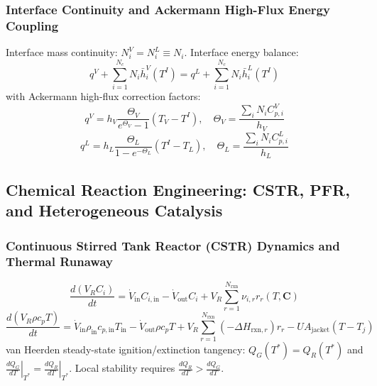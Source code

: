 \documentclass[11pt,a4paper]{article}
\begin{document}
\subsubsection{Interface Continuity and Ackermann High-Flux Energy Coupling}
Interface mass continuity: $N_i^V = N_i^L \equiv N_i$. Interface energy balance:
\begin{equation}
q^V + \sum_{i=1}^{N_c} N_i \bar{h}_i^V(T^I) = q^L + \sum_{i=1}^{N_c} N_i \bar{h}_i^L(T^I)
\end{equation}
with Ackermann high-flux correction factors:
\begin{equation}
q^V = h_V \frac{\Theta_V}{e^{\Theta_V} - 1} (T_V - T^I), \quad \Theta_V = \frac{\sum_i N_i C_{p,i}^V}{h_V}
\end{equation}
\begin{equation}
q^L = h_L \frac{\Theta_L}{1 - e^{-\Theta_L}} (T^I - T_L), \quad \Theta_L = \frac{\sum_i N_i C_{p,i}^L}{h_L}
\end{equation}

\subsection{Chemical Reaction Engineering: CSTR, PFR, and Heterogeneous Catalysis}

\subsubsection{Continuous Stirred Tank Reactor (CSTR) Dynamics and Thermal Runaway}
\begin{equation}
\frac{d(V_R C_i)}{dt} = \dot{V}_{\text{in}} C_{i,\text{in}} - \dot{V}_{\text{out}} C_i + V_R \sum_{r=1}^{N_{\text{rxn}}} \nu_{i,r} r_r(T, \mathbf{C})
\end{equation}
\begin{equation}
\frac{d(V_R \rho c_p T)}{dt} = \dot{V}_{\text{in}} \rho_{\text{in}} c_{p,\text{in}} T_{\text{in}} - \dot{V}_{\text{out}} \rho c_p T + V_R \sum_{r=1}^{N_{\text{rxn}}} (-\Delta H_{\text{rxn},r}) r_r - U A_{\text{jacket}} (T - T_j)
\end{equation}
van Heerden steady-state ignition/extinction tangency: $Q_G(T^*) = Q_R(T^*)$ and $\left. \frac{dQ_G}{dT} \right|_{T^*} = \left. \frac{dQ_R}{dT} \right|_{T^*}$. Local stability requires $\frac{dQ_R}{dT} > \frac{dQ_G}{dT}$.
\end{document}
